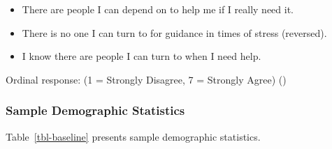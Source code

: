 \documentclass[
  single column]{article}
\providecommand{\tightlist}{%
  \setlength{\itemsep}{0pt}\setlength{\parskip}{0pt}}\usepackage{longtable,booktabs,array}
\begin{document}
\begin{itemize}
\tightlist
\item
  There are people I can depend on to help me if I really need it.
\item
  There is no one I can turn to for guidance in times of stress
  (reversed).
\item
  I know there are people I can turn to when I need help.
\end{itemize}

Ordinal response: (1 = Strongly Disagree, 7 = Strongly Agree)
()

\subsubsection{Sample Demographic
Statistics}\label{sample-demographic-statistics}

Table~\ref{tbl-baseline} presents sample demographic statistics.

\begingroup\fontsize{6}{8}\selectfont
\begingroup\fontsize{6}{8}\selectfont
\end{document}
